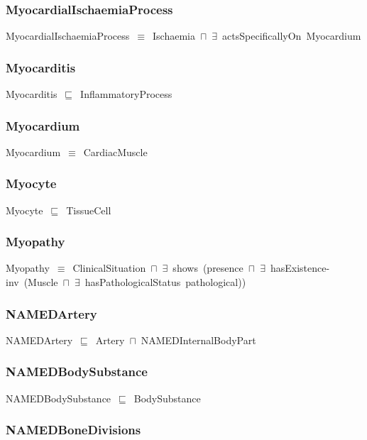 \documentclass{article}
\begin{document}
\subsubsection*{MyocardialIschaemiaProcess}

MyocardialIschaemiaProcess~\ensuremath{\equiv}~Ischaemia~\ensuremath{\sqcap}~\ensuremath{\exists}~actsSpecificallyOn~Myocardium

\subsubsection*{Myocarditis}

Myocarditis~\ensuremath{\sqsubseteq}~InflammatoryProcess~

\subsubsection*{Myocardium}

Myocardium~\ensuremath{\equiv}~CardiacMuscle

\subsubsection*{Myocyte}

Myocyte~\ensuremath{\sqsubseteq}~TissueCell~

\subsubsection*{Myopathy}

Myopathy~\ensuremath{\equiv}~ClinicalSituation~\ensuremath{\sqcap}~\ensuremath{\exists}~shows~(presence~\ensuremath{\sqcap}~\ensuremath{\exists}~hasExistence-inv~(Muscle~\ensuremath{\sqcap}~\ensuremath{\exists}~hasPathologicalStatus~pathological))

\subsubsection*{NAMEDArtery}

NAMEDArtery~\ensuremath{\sqsubseteq}~Artery~\ensuremath{\sqcap}~NAMEDInternalBodyPart~

\subsubsection*{NAMEDBodySubstance}

NAMEDBodySubstance~\ensuremath{\sqsubseteq}~BodySubstance~

\subsubsection*{NAMEDBoneDivisions}
\end{document}
